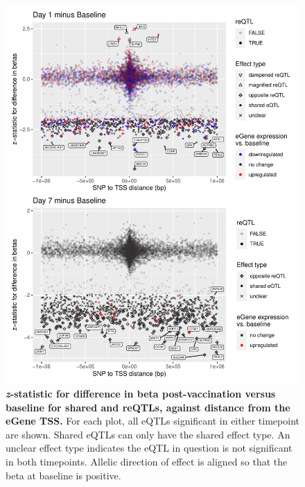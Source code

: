 \begin{figure}
    \centering
    \includegraphics[width=1.0\textwidth]{mainmatter/figures/chapter_03/compare_dge_eqtl.z_sharing.vs.SNP_gene_TSS_dist.pdf}
    \caption{
        \textbf{\textit{z}-statistic for difference in beta post-vaccination versus baseline for shared and \glspl{reQTL}, against distance from the eGene \gls{TSS}.}
        For each plot, all \glspl{eQTL} significant in either timepoint are shown.
        Shared \glspl{eQTL} can only have the shared effect type.
        An unclear effect type indicates the \gls{eQTL} in question is not significant in both timepoints.
        Allelic direction of effect is aligned so that the beta at baseline is positive. 
    }
    \label{fig:hird_reQTL_zSharing_vs_TSSdist_mega}
\end{figure}

